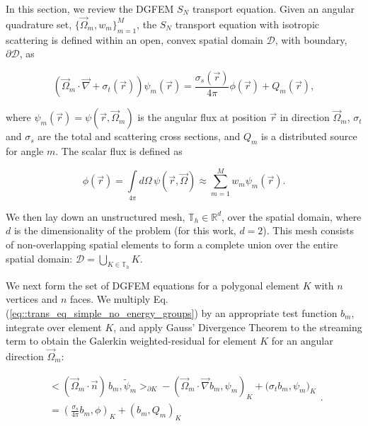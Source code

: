 \documentclass[preprint,10pt]{elsarticle}
\begin{document}
In this section, we review the DGFEM $S_N$ transport equation. Given an angular quadrature set, $\{  \vec{\Omega}_m, w_m \}_{m=1}^M$, the $S_N$ transport equation with isotropic scattering is defined within an open, convex spatial domain $\mathcal{D}$, with boundary, $\partial \mathcal{D}$, as

\begin{equation}
\label{eq::trans_eq_simple_no_energy_groups}
\left( \vec{\Omega}_m \cdot \vec{\nabla}  + \sigma_{t} (\vec{r}) \right)  \psi_{m} (\vec{r})=  \frac{\sigma_{s} (\vec{r})}{4 \pi}  \phi (\vec{r}) + Q_{m} (\vec{r}) ,
\end{equation}

\noindent where $\psi_{m} (\vec{r}) = \psi (\vec{r}, \vec{\Omega}_m)$ is the angular flux at position $\vec{r}$ in direction $\vec{\Omega}_m$, $\sigma_{t}$ and $\sigma_{s}$ are the total and scattering cross sections, and $Q_{m}$ is a distributed source for angle $m$. The scalar flux is defined as

\begin{equation}
\label{eq::scalar_flux_int}
\phi (\vec{r}) = \int\limits_{4 \pi} d \Omega \, \psi (\vec{r}, \vec{\Omega}) \approx \sum_{m=1}^{M} w_m \psi_{m} (\vec{r}) .
\end{equation}

\noindent We then lay down an unstructured mesh, $\mathbb{T}_h \in \mathbb{R}^{d}$, over the spatial domain, where $d$ is the dimensionality of the problem (for this work, $d=2$). This mesh consists of non-overlapping spatial elements to form a complete union over the entire spatial domain: $\mathcal{D} = \bigcup_{K \in \mathbb{T}_h} K$. 

We next form the set of DGFEM equations for a polygonal element $K$ with $n$ vertices and $n$ faces. We multiply Eq. (\ref{eq::trans_eq_simple_no_energy_groups}) by an appropriate test function $b_m$, integrate over element $K$, and apply Gauss' Divergence Theorem to the streaming term to obtain the Galerkin weighted-residual for element $K$ for an angular direction $\vec{\Omega}_m$:

\begin{equation}
\label{eq::DGFEM_trans_eq_cellK}
\begin{aligned}
 \Big< ( \vec{\Omega}_m \cdot \vec{n} ) \, b_m, \tilde{\psi}_m  \Big>_{\partial K} - \left( \vec{\Omega}_m \cdot  \vec{\nabla} b_m, \psi_{m} \right)_{K}  + \Big(  \sigma_{t} b_m ,   \psi_{m} \Big)_{K} \\
=  \left( \frac{\sigma_s}{4 \pi} b_m ,   \phi \right)_{K} + \left(  b_m ,   Q_{m} \right)_{K}
\end{aligned} .
\end{equation}
\end{document}
